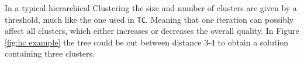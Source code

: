 \documentclass[a4paper,10pt]{article}
\theoremstyle{plain}
\theoremstyle{definition}
\begin{document}
In a typical hierarchical Clustering the size and number of clusters are given by a threshold, much like the one used in \texttt{TC}. Meaning that one iteration can possibly affect all clusters, which either increases or decreases the overall quality. In Figure \ref{fig:hc example} the tree could be cut between distance 3-4 to obtain a solution containing three clusters.

\end{document}
